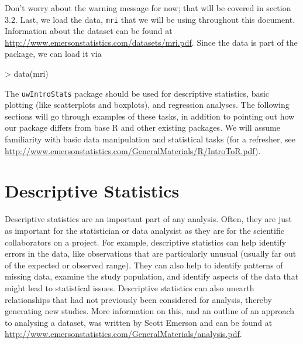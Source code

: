 \documentclass[landscape]{article}
\renewenvironment{Schunk}{\vspace{\topsep}}{\vspace{\topsep}}
\begin{document}
Don't worry about the warning message for now; that will be covered in section 3.2. Last, we load the data, \texttt{mri} that we will be using throughout this document. Information about the dataset can be found at \url{http://www.emersonstatistics.com/datasets/mri.pdf}. Since the data is part of the package, we can load it via
\begin{Schunk}
\begin{Sinput}
> data(mri)
\end{Sinput}
\end{Schunk}

The \texttt{uwIntroStats} package should be used for descriptive statistics, basic plotting (like scatterplots and boxplots), and regression analyses. The following sections will go through examples of these tasks, in addition to pointing out how our package differs from base R and other existing packages. We will assume familiarity with basic data manipulation and statistical tasks (for a refresher, see \url{http://www.emersonstatistics.com/GeneralMaterials/R/IntroToR.pdf}).

\section{Descriptive Statistics}
Descriptive statistics are an important part of any analysis. Often, they are just as important for the statistician or data analysist as they are for the scientific collaborators on a project. For example, descriptive statistics can help identify errors in the data, like observations that are particularly unusual (usually far out of the expected or observed range). They can also help to identify patterns of missing data, examine the study population, and identify aspects of the data that might lead to statistical issues. Descriptive statistics can also unearth relationships that had not previously been considered for analysis, thereby generating new studies. More information on this, and an outline of an approach to analysing a dataset, was written by Scott Emerson and can be found at \url{http://www.emersonstatistics.com/GeneralMaterials/analysis.pdf}. 
\end{document}
